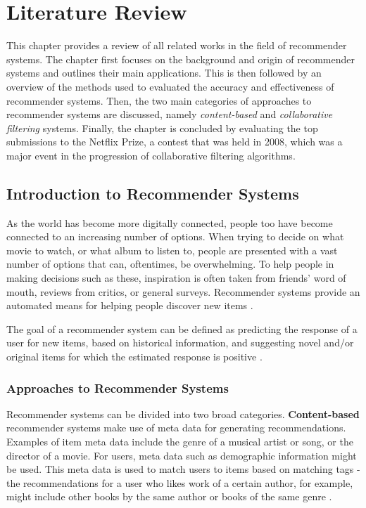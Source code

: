 \chapter{Literature Review}
\label{lit_review} %
This chapter provides a review of all related works in the field of recommender systems. The chapter first focuses on the background and origin of recommender systems and outlines their main applications. This is then followed by an overview of the methods used to evaluated the accuracy and effectiveness of recommender systems. Then, the two main categories of approaches to recommender systems are discussed, namely \textit{content-based} and \textit{collaborative filtering} systems. Finally, the chapter is concluded by evaluating the top submissions to the Netflix Prize, a contest that was held in 2008, which was a major event in the progression of collaborative filtering algorithms.

\section{Introduction to Recommender Systems}
As the world has become more digitally connected, people too have become connected to an increasing number of options. When trying to decide on what movie to watch, or what album to listen to, people are presented with a vast number of options that can, oftentimes, be overwhelming. To help people in making decisions such as these, inspiration is often taken from friends' word of mouth, reviews from critics, or general surveys. Recommender systems provide an automated means for helping people discover new items \parencite{rs_1.1_Resnick}.

The goal of a recommender system can be defined as predicting the response of a user for new items, based on historical information, and suggesting novel and/or original items for which the estimated response is positive \parencite{handbook_1.4_neighbourhood}.

\subsection*{Approaches to Recommender Systems}
Recommender systems can be divided into two broad categories. \textbf{Content-based} recommender systems make use of meta data for generating recommendations. Examples of item meta data include the genre of a musical artist or song, or the director of a movie. For users, meta data such as demographic information might be used. This meta data is used to match users to items based on matching tags - the recommendations for a user who likes work of a certain author, for example, might include other books by the same author or books of the same genre \parencite{di2012linked}.

